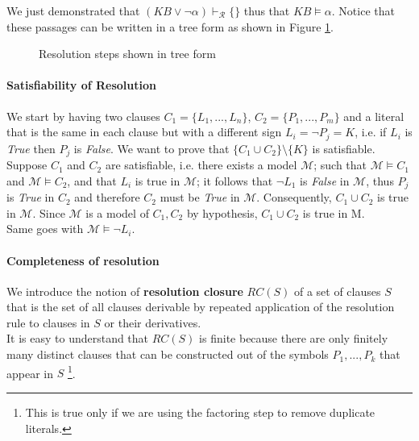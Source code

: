 \documentclass[10pt,a4paper]{article}
\begin{document}
We just demonstrated that $(KB \vee \neg \alpha) \vdash_{\mathcal{R}} \{\}$ thus that $KB\models \alpha$. Notice that these passages can be written in a tree form as shown in Figure \ref{fig:res_expansion}.
\begin{figure}[H]
\centering
{}
\caption{Resolution steps shown in tree form}
\label{fig:res_expansion}
\end{figure}

\paragraph{Satisfiability of Resolution} We start by having two clauses $C_1=\lbrace L_1,...,L_n\rbrace$, $C_2=\lbrace P_1,...,P_m\rbrace$ and a literal that is the same in each clause but with a different sign $L_i=\neg P_j=K$, i.e. if $L_i$ is \textit{True} then $P_j$ is \textit{False}. We want to prove that $\lbrace C_1 \cup C_2 \rbrace \setminus \{K\}$ is satisfiable.\\
Suppose $C_1$ and $C_2$ are satisfiable, i.e. there exists a model $\mathcal{M}$; such that $\mathcal{M}\models C_1$ and $\mathcal{M}\models C_2$, and that $L_i$ is true in $\mathcal{M}$; it follows that $\neg L_1$ is \textit{False} in $\mathcal{M}$, thus $P_j$ is \textit{True} in $C_2$ and therefore $C_2$ must be \textit{True} in $\mathcal{M}$. Consequently, $C_1\cup C_2$ is true in $\mathcal{M}$. Since $\mathcal{M}$ is a model of $C_1,C_2$ by hypothesis, $C_1\cup C_2$  is true in M.\\
Same goes with $\mathcal{M}\models \neg L_i$.


\paragraph{Completeness of resolution}
\label{par:ground_res_theo}
We introduce the notion of \textbf{resolution closure} $RC(S)$ of a set of clauses $S$ that  is the set of all clauses derivable by repeated application of the resolution rule to clauses in $S$ or their derivatives.\\
It is easy to understand that $RC(S)$ is finite because there are only finitely many distinct clauses that can be constructed out of the symbols $P_1, . . . , P_k$ that appear in $S$ \footnote{This is true only if we are using the factoring step to remove duplicate literals.}.\\ 
\end{document}
